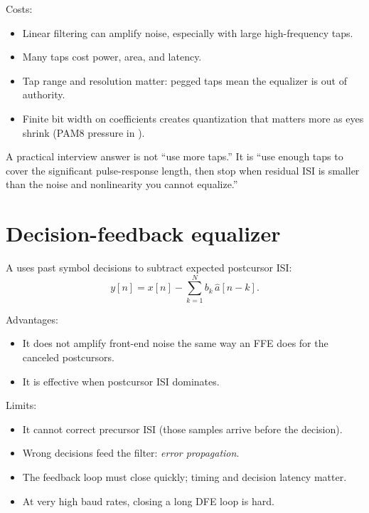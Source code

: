 Costs:

\begin{itemize}
\item Linear filtering can amplify noise, especially with large high-frequency
      taps.
\item Many taps cost power, area, and latency.
\item Tap range and resolution matter: pegged taps mean the equalizer is out of
      authority.
\item Finite bit width on coefficients creates quantization that matters more as
      eyes shrink (PAM8 pressure in ).
\end{itemize}

A practical interview answer is not ``use more taps.'' It is ``use enough taps
to cover the significant pulse-response length, then stop when residual ISI is
smaller than the noise and nonlinearity you cannot equalize.''

\section{Decision-feedback equalizer}
\label{sec:eq-dfe}

A  uses past symbol decisions to subtract expected
postcursor ISI:
\begin{equation}
y[n] = x[n] - \sum_{k=1}^{N} b_k\,\hat{a}[n-k].
\label{eq:dfe}
\end{equation}

Advantages:

\begin{itemize}
\item It does not amplify front-end noise the same way an FFE does for the
      canceled postcursors.
\item It is effective when postcursor ISI dominates.
\end{itemize}

Limits:

\begin{itemize}
\item It cannot correct precursor ISI (those samples arrive before the
      decision).
\item Wrong decisions feed the filter: \emph{error propagation}.
\item The feedback loop must close quickly; timing and decision latency matter.
\item At very high baud rates, closing a long DFE loop is hard.
\end{itemize}

